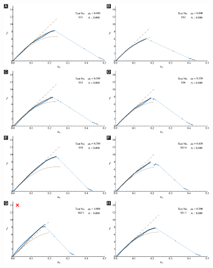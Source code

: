 \documentclass[preprint,10pt,times]{elsarticle}
\numberwithin{equation}{section}
\begin{document}
\begin{figure}
\centering{}\includegraphics[width=1\textwidth]{../Figures_Submit/Cat3Sub1.pdf}
\end{figure}
\end{document}
